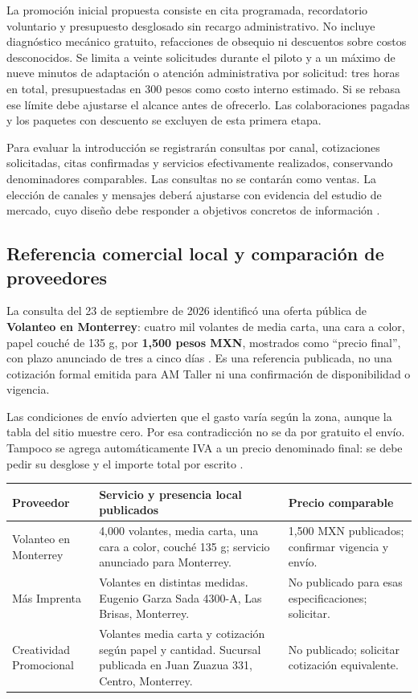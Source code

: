 {La promoción inicial propuesta consiste en cita programada, recordatorio voluntario y presupuesto desglosado sin recargo administrativo. No incluye diagnóstico mecánico gratuito, refacciones de obsequio ni descuentos sobre costos desconocidos. Se limita a veinte solicitudes durante el piloto y a un máximo de nueve minutos de adaptación o atención administrativa por solicitud: tres horas en total, presupuestadas en 300 pesos como costo interno estimado. Si se rebasa ese límite debe ajustarse el alcance antes de ofrecerlo. Las colaboraciones pagadas y los paquetes con descuento se excluyen de esta primera etapa.

Para evaluar la introducción se registrarán consultas por canal, cotizaciones solicitadas, citas confirmadas y servicios efectivamente realizados, conservando denominadores comparables. Las consultas no se contarán como ventas. La elección de canales y mensajes deberá ajustarse con evidencia del estudio de mercado, cuyo diseño debe responder a objetivos concretos de información \citep{albrechtMarketing2023}.

\subsection{Referencia comercial local y comparación de proveedores}

La consulta del 23 de septiembre de 2026 identificó una oferta pública de \textbf{Volanteo en Monterrey}: cuatro mil volantes de media carta, una cara a color, papel couché de 135 g, por \textbf{1,500 pesos MXN}, mostrados como ``precio final'', con plazo anunciado de tres a cinco días \citep{volanteoMonterreyPromociones}. Es una referencia publicada, no una cotización formal emitida para AM Taller ni una confirmación de disponibilidad o vigencia.

Las condiciones de envío advierten que el gasto varía según la zona, aunque la tabla del sitio muestre cero. Por esa contradicción no se da por gratuito el envío. Tampoco se agrega automáticamente IVA a un precio denominado final: se debe pedir su desglose y el importe total por escrito \citep{volanteoMonterreyEnvio}.

\begin{longtable}{p{.23\linewidth}p{.44\linewidth}p{.20\linewidth}}
\toprule
\textbf{Proveedor} & \textbf{Servicio y presencia local publicados} & \textbf{Precio comparable}\\
\midrule
Volanteo en Monterrey & 4,000 volantes, media carta, una cara a color, couché 135 g; servicio anunciado para Monterrey. & 1,500 MXN publicados; confirmar vigencia y envío.\\
Más Imprenta & Volantes en distintas medidas. Eugenio Garza Sada 4300-A, Las Brisas, Monterrey. & No publicado para esas especificaciones; solicitar.\\
Creatividad Promocional & Volantes media carta y cotización según papel y cantidad. Sucursal publicada en Juan Zuazua 331, Centro, Monterrey. & No publicado; solicitar cotización equivalente.\\
\bottomrule
\end{longtable}

}
